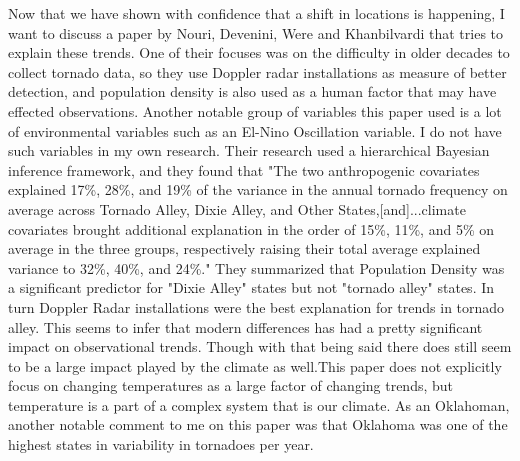\documentclass[12pt,english]{article}
\begin{document}
Now that we have shown with confidence that a shift in locations is happening, I want to discuss a paper by Nouri, Devenini, Were and Khanbilvardi that tries to explain these trends. One of their focuses was on the difficulty in older decades to collect tornado data, so they use Doppler radar installations as measure of better detection, and population density is also used as a human factor that may have effected observations. Another notable group of variables this paper used is a lot of environmental variables such as an El-Nino Oscillation variable. I do not have such variables in my own research. Their research used a hierarchical Bayesian inference framework, and they found that "The two anthropogenic covariates explained 17\%, 28\%, and 19\% of the variance in the annual tornado frequency on average across Tornado Alley, Dixie Alley, and Other States,[and]...climate covariates brought additional explanation in the order of 15\%, 11\%, and 5\% on average in the three groups, respectively raising their total average explained variance to 32\%, 40\%, and 24\%."\cite{Nouri2021} They summarized that Population Density was a significant predictor for "Dixie Alley" states but not "tornado alley" states. In turn Doppler Radar installations were the best explanation for trends in tornado alley. This seems to infer that modern differences has had a pretty significant impact on observational trends. Though with that being said there does still seem to be a large impact played by the climate as well.This paper does not explicitly focus on changing temperatures as a large factor of changing trends, but temperature is a part of a complex system that is our climate. As an Oklahoman, another notable comment to me on this paper was that Oklahoma was one of the highest states in variability in tornadoes per year.\\ 
\end{document}

